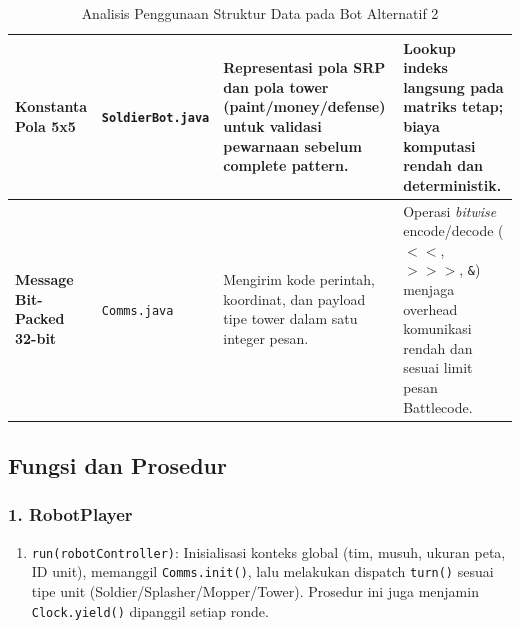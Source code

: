 \begin{table}[htbp]
\begin{tabular}{|p{3.5cm}|p{3.5cm}|p{4cm}|p{4cm}|}
		\hline
		\textbf{Konstanta Pola 5x5}         & \texttt{SoldierBot.java}                                                     & Representasi pola SRP dan pola tower (paint/money/defense) untuk validasi pewarnaan sebelum complete pattern.             & Lookup indeks langsung pada matriks tetap; biaya komputasi rendah dan deterministik.                                                                          \\
		\hline
		\textbf{Message Bit-Packed 32-bit}  & \texttt{Comms.java}                                                          & Mengirim kode perintah, koordinat, dan payload tipe tower dalam satu integer pesan.                                       & Operasi \textit{bitwise} encode/decode ($<<$, $>>>$, \texttt{\&}) menjaga overhead komunikasi rendah dan sesuai limit pesan Battlecode.                       \\
		\hline
	\end{tabular}
	\caption{Analisis Penggunaan Struktur Data pada Bot Alternatif 2}
\end{table}

\newpage
\subsection{Fungsi dan Prosedur}

\subsubsection{1. RobotPlayer}
\begin{enumerate}
	\item \texttt{run(robotController)}:
	      Inisialisasi konteks global (tim, musuh, ukuran peta, ID unit), memanggil \texttt{Comms.init()}, lalu melakukan dispatch \texttt{turn()} sesuai tipe unit (Soldier/Splasher/Mopper/Tower). Prosedur ini juga menjamin \texttt{Clock.yield()} dipanggil setiap ronde.
\end{enumerate}

